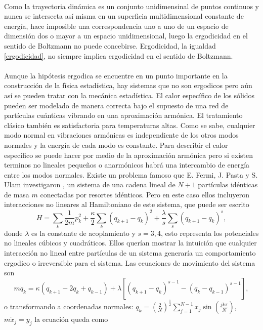 \\ 
Como la trayectoria dinámica es un conjunto unidimensinal de puntos continuos y nunca se intersecta así misma en un superficia multidimensional constante de energía, hace imposible una correspondencia uno a uno de un espacio de dimensión dos o mayor a un espacio unidimensional, luego la ergodicidad en el sentido de Boltzmann no puede concebirse. Ergodicidad, la igualdad \ref{ergodicidad}, no siempre implica ergodicidad en el sentido de Boltzmann.
\\
\\
Aunque la hipótesis ergodica se encuentre en un punto importante en la construcción de la física estadística, hay sistemas que no son ergodicos pero aún así se pueden tratar con la mecánica estadística. El calor específico de los sólidos pueden ser modelado de manera correcta bajo el supuesto de una red de partículas cuánticas vibrando en una aproximación armónica.  El tratamiento clásico también es satisfactoria para temperaturas altas. Como se sabe, cualquier modo normal en vibraciones armónicas es independiente de los otros modos normales y la energía de cada modo es constante. Para describir el calor específico se puede hacer por medio de la aproximación armónica pero si existen terminos no lineales pequeños o anarmónicos habrá una intercambio de energía entre los modos normales. Existe un problema famoso que E. Fermi, J. Pasta y S. Ulam investigaron \cite{FermiPastaUlam}, un sistema de una cadena lineal de $N+1$ partículas idénticas de masa $m$ conectadas por resortes idénticos. Pero en  este caso ellos incluyeron interacciones no lineares al Hamiltoniano de este sistema, que puede ser escrito 
\begin{equation}
H= \sum_{k} \frac{1}{2m} p_{k}^{2} +\frac{\kappa}{2}\sum_{k} (q_{k+1}-q_{k})^{2}+\frac{\lambda}{s}\sum_{s} (q_{k+1}-q_{k})^{s},
\end{equation}
donde $\lambda$ es la constante de acoplamiento y $s=3,4$, esto representa los potenciales no lineales cúbicos y cuadráticos. Ellos querían mostrar la intuición que cualquier interacción no lineal entre partículas de un sistema generaría un comportamiento ergodico  o irreversible para el sistema. Las ecuaciones de movimiento del sistema son
\begin{equation}
m \ddot{q}_{k}= \kappa (q_{k+1}-2q_{k}+q_{k-1})+ \lambda[(q_{k+1}-q_{k})^{s-1}-(q_{k}-q_{k-1})^{s-1}],
\end{equation} 
o transformando a coordenadas normales: $q_{k}=(\frac{2}{N})^{\frac{1}{2}} \sum_{j=1}^{N-1}x_{j} \sin (\frac{jk \pi }{N})$, $m\dot{x}_{j}=y_{j}$ la ecuación queda como
